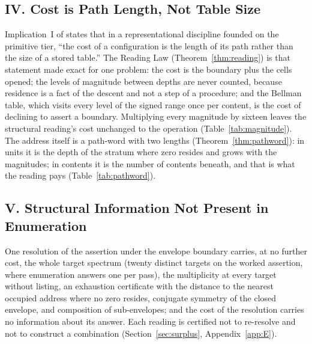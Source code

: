 \documentclass[pdflatex,sn-mathphys-num]{sn-jnl}
\theoremstyle{thmstyleone}%
\theoremstyle{thmstyletwo}%
\theoremstyle{thmstylethree}%
\newcommand{\PA}{\cite{Swanagon2026PA}}
\newcommand{\q}[1]{``#1''}        %
\begin{document}
\subsection*{IV. Cost is Path Length, Not Table Size}
Implication~I of \PA{} states that in a representational discipline founded on the primitive tier, \q{the cost of a configuration is the length of its path rather than the size of a stored table.} The Reading Law (Theorem~\ref{thm:reading}) is that statement made exact for one problem: the cost is the boundary plus the cells opened; the levels of magnitude between depths are never counted, because residence is a fact of the descent and not a step of a procedure; and the Bellman table, which visits every level of the signed range once per content, is the cost of declining to assert a boundary. Multiplying every magnitude by sixteen leaves the structural reading's cost unchanged to the operation (Table~\ref{tab:magnitude}). The address itself is a path-word with two lengths (Theorem~\ref{thm:pathword}): in units it is the depth of the stratum where zero resides and grows with the magnitudes; in contents it is the number of contents beneath, and that is what the reading pays (Table~\ref{tab:pathword}).

\subsection*{V. Structural Information Not Present in Enumeration}
One resolution of the assertion under the envelope boundary carries, at no further cost, the whole target spectrum (twenty distinct targets on the worked assertion, where enumeration answers one per pass), the multiplicity at every target without listing, an exhaustion certificate with the distance to the nearest occupied address where no zero resides, conjugate symmetry of the closed envelope, and composition of sub-envelopes; and the cost of the resolution carries no information about its answer. Each reading is certified not to re-resolve and not to construct a combination (Section~\ref{sec:surplus}, Appendix~\ref{app:E}).
\end{document}
